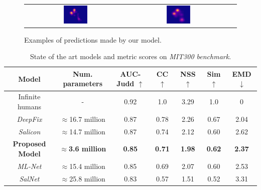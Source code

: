 \documentclass[10pt,twocolumn,letterpaper]{article}
\begin{document}
\begin{figure}
\begin{center}
\begin{tabular} {ccc}
    \includegraphics[width=0.25\textwidth]{./img/sign_gt.jpg} &
    \includegraphics[width=0.25\textwidth]{./img/sign_m.jpg}\\
    \end{tabular}
\end{center}
    \caption{Examples of predictions made by our model.}
    \label{fig:preds}
\end{figure}

\begin{table}
	\small
    \begin{center}
    \label{table:results}
    \caption{State of the art models and metric scores on
    \emph{MIT300 benchmark}.}
    \begin{tabular}{|c|c|c|c|c|c|c|}
        \hline
        Model & Num. parameters & AUC-Judd $\uparrow$ & CC $\uparrow$
            & NSS $\uparrow$ & Sim $\uparrow$ & EMD $\downarrow$\\
        \hline
        Infinite humans & - & 0.92 & 1.0 & 3.29 & 1.0 & 0\\
        \hline
        \emph{DeepFix} & $\approx$16.7 million & 0.87 & 0.78
            & 2.26 & 0.67 & 2.04\\
        \hline
        \emph{Salicon} & $\approx$14.7 million & 0.87 & 0.74 & 2.12
            & 0.60 & 2.62\\
        \hline
        \textbf{Proposed Model} & $\approx$\textbf{3.6 million}
            & \textbf{0.85} &
        \textbf{0.71} & \textbf{1.98} & \textbf{0.62} & \textbf{2.37}\\
        \hline
        \emph{ML-Net} & $\approx$15.4 million & 0.85 & 0.69 & 2.07 & 0.60
            & 2.53\\
        \hline
        \emph{SalNet} & $\approx$25.8 million & 0.83 & 0.57 & 1.51
            & 0.52 & 3.31\\
        \hline
    \end{tabular}
    \end{center}
\end{table}

{\small


}
\end{document}

